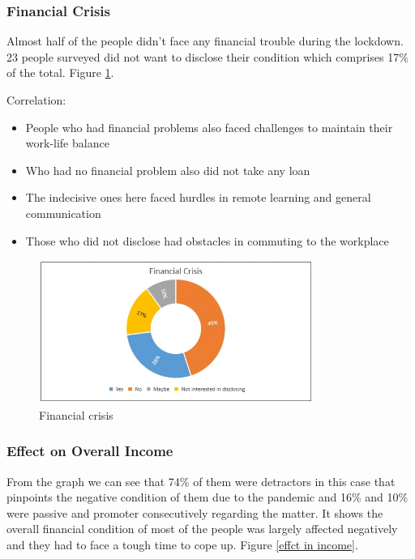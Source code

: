 \documentclass[11pt]{article}
\begin{document}
\subsubsection{Financial Crisis}
Almost half of the people didn't face any financial trouble during the lockdown. 23 people surveyed did not want to disclose their condition which comprises 17\% of the total. Figure \ref{Crisis}. 

Correlation:
\begin{itemize}
    \item People who had financial problems also faced challenges to maintain their work-life balance
    \item Who had no financial problem also did not take any loan
    \item The indecisive ones here faced hurdles in remote learning and general communication
    \item Those who did not disclose had obstacles in commuting to the workplace
\end{itemize}
\newpage
\begin{figure}[!ht]
	\centering
	\includegraphics[width=0.8\textwidth]{Images/Finance/Financial Crisis.jpg}
	\caption{Financial crisis}
	\centering
	\label{Crisis}
\end{figure}

\subsubsection{Effect on Overall Income}
From the graph we can see that 74\% of them were detractors in this case that pinpoints the negative condition of them due to the pandemic and 16\% and 10\% were passive and promoter consecutively regarding the matter. It shows the overall financial condition of most of the people was largely affected negatively and they had to face a tough time to cope up. Figure \ref{effct in income}.
\end{document}
